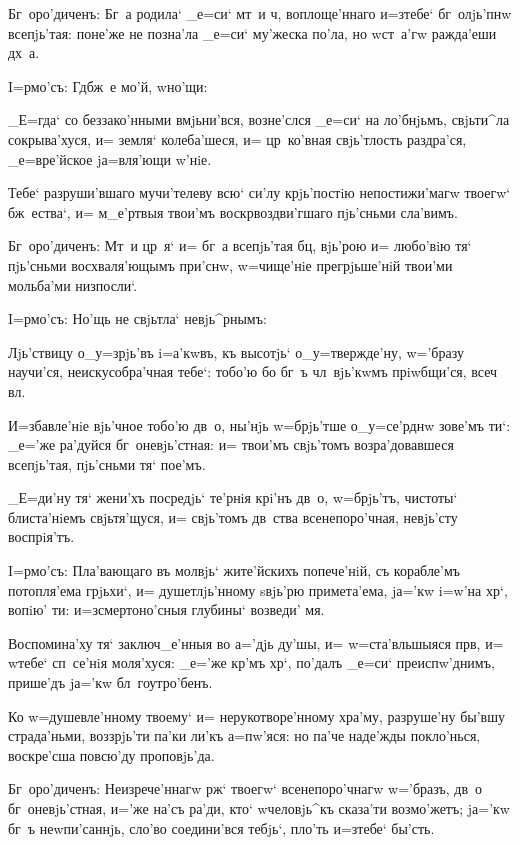 Бг~оро'диченъ: Бг~а родила` _е=си` мт~и ч, 
воплоще'ннаго и=з\ъ тебе` бг~олjь'пнw всепjь'тая: поне'же 
не позна'ла _е=си` му'жеска по'ла, но w\т ст~а'гw 
ражда'еши дх~а.

 I=рмо'съ: Гд бж~е мо'й, w\т но'щи:

_Е=гда` со беззако'нными вмjьни'вся, возне'слся _е=си` 
на ло'бнjьмъ, свjьти^ла сокрыва'хуся, и= земля` 
колеба'шеся, и= цр~ко'вная свjь'тлость раздра'ся, 
_е=вре'йское jа=вля'ющи w'нiе.

Тебе` разруши'вшаго мучи'телеву всю` си'лу крjь'постiю 
непостижи'магw твоегw` бж~ества`, и= м_е'ртвыя твои'мъ 
воскр воздви'гшаго пjь'сньми сла'вимъ.

Бг~оро'диченъ: Мт~и цр~я` и= бг~а всепjь'тая бц, 
вjь'рою и= любо'вiю тя` пjь'сньми восхваля'ющымъ при'снw, 
w=чище'нiе прегрjьше'нiй твои'ми мольба'ми низпосли`.

 I=рмо'съ: Но'щь не свjьтла` невjь^рнымъ:

Лjь'ствицу о_у=зрjь'въ i=а'кwвъ, къ высотjь` 
о_у=твержде'ну, w='бразу научи'ся, неискусобра'чная 
тебе`: тобо'ю бо бг~ъ чл~вjь'кwмъ прiwбщи'ся, всеч 
вл.

И=збавле'нiе вjь'чное тобо'ю дв~о, ны'нjь w=брjь'тше 
о_у=се'рднw зове'мъ ти`: _е='же ра'дуйся бг~оневjь'стная: 
и= твои'мъ свjь'томъ возра'довавшеся всепjь'тая, 
пjь'сньми тя` пое'мъ.

_Е=ди'ну тя` жени'хъ посредjь` те'рнiя крi'нъ дв~о, 
w=брjь'тъ, чистоты` блиста'нiемъ свjьтя'щуся, и= 
свjь'томъ дв~ства всенепоро'чная, невjь'сту воспрiя'тъ.


I=рмо'съ: Пла'вающаго въ молвjь` жите'йскихъ 
попече'нiй, съ корабле'мъ потопля'ема грjьхи`, и= 
душетлjь'нному sвjь'рю примета'ема, jа='кw i=w'на 
хр`, вопiю' ти: и=з\ъ смертоно'сныя глубины` возведи' 
мя.

Воспомина'ху тя` заключ_е'нныя во а='дjь ду'шы, и= 
w=ста'вльшыяся прв, и= w\т тебе` сп~се'нiя 
моля'хуся: _е='же кр'мъ хр`, по'далъ _е=си` 
преиспw'днимъ, прише'дъ jа='кw бл~гоутро'бенъ.

Ко w=душевле'нному твоему` и= нерукотворе'нному 
хра'му, разруше'ну бы'вшу страда'ньми, воззрjь'ти па'ки 
ли'къ а=п w'яся: но па'че наде'жды 
покло'нься, воскре'сша повсю'ду проповjь'да.

Бг~оро'диченъ: Неизрече'ннагw рж` твоегw` 
всенепоро'чнагw w='бразъ, дв~о бг~оневjь'стная, и='же 
на'съ ра'ди, кто` w\т человjь^къ сказа'ти возмо'жетъ; 
jа='кw бг~ъ неwпи'саннjь, сло'во соедини'вся тебjь`, 
пло'ть и=з\ъ тебе` бы'сть.

